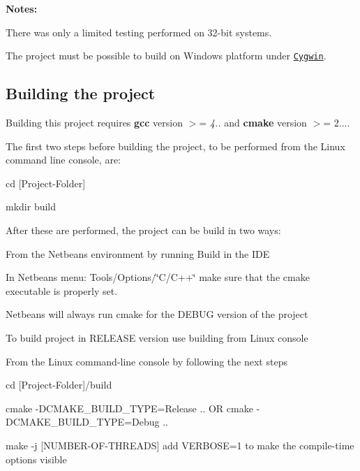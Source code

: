 {\bfseries Notes\+:}


\begin{DoxyEnumerate}
\item There was only a limited testing performed on 32-\/bit systems.
\item The project must be possible to build on Windows platform under \href{https://www.cygwin.com/}{\tt Cygwin}.
\end{DoxyEnumerate}

\subsection*{Building the project}

Building this project requires {\bfseries gcc} version $>$= {\itshape 4..} and {\bfseries cmake} version $>$= 2....

The first two steps before building the project, to be performed from the Linux command line console, are\+:


\begin{DoxyEnumerate}
\item {\ttfamily cd \mbox{[}Project-\/\+Folder\mbox{]}}
\item {\ttfamily mkdir build}
\end{DoxyEnumerate}

After these are performed, the project can be build in two ways\+:


\begin{DoxyItemize}
\item From the Netbeans environment by running Build in the I\+D\+E
\begin{DoxyItemize}
\item In Netbeans menu\+: {\ttfamily Tools/\+Options/\char`\"{}\+C/\+C++\char`\"{}} make sure that the cmake executable is properly set.
\item Netbeans will always run cmake for the D\+E\+B\+U\+G version of the project
\item To build project in R\+E\+L\+E\+A\+S\+E version use building from Linux console
\end{DoxyItemize}
\item From the Linux command-\/line console by following the next steps
\begin{DoxyItemize}
\item {\ttfamily cd \mbox{[}Project-\/\+Folder\mbox{]}/build}
\item {\ttfamily cmake -\/\+D\+C\+M\+A\+K\+E\+\_\+\+B\+U\+I\+L\+D\+\_\+\+T\+Y\+P\+E=Release ..} O\+R {\ttfamily cmake -\/\+D\+C\+M\+A\+K\+E\+\_\+\+B\+U\+I\+L\+D\+\_\+\+T\+Y\+P\+E=Debug ..}
\item {\ttfamily make -\/j \mbox{[}N\+U\+M\+B\+E\+R-\/\+O\+F-\/\+T\+H\+R\+E\+A\+D\+S\mbox{]}} add {\ttfamily V\+E\+R\+B\+O\+S\+E=1} to make the compile-\/time options visible
\end{DoxyItemize}
\end{DoxyItemize}

